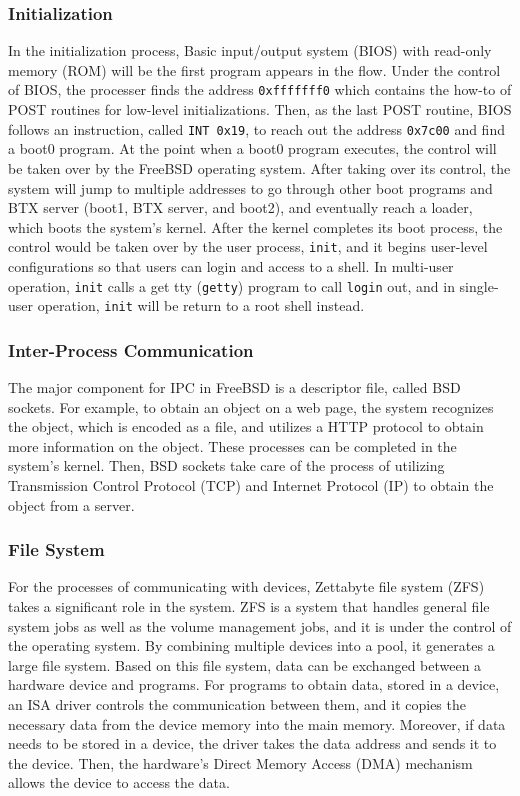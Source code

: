 \documentclass[12pt, dvipsnames, a4paper]{article}
\newcommand{\code}[1]{\texttt{#1}}
\begin{document}
\subsubsection{Initialization}
In the initialization process, Basic input/output system (BIOS) with read-only memory (ROM) will be the first program appears in the flow. Under the control of BIOS, the processer finds the address \code{0xfffffff0} which contains the how-to of POST routines for low-level initializations. Then, as the last POST routine, BIOS follows an instruction, called \code{INT 0x19}, to reach out the address \code{0x7c00} and find a boot0 program. At the point when a boot0 program executes, the control will be taken over by the FreeBSD operating system. After taking over its control, the system will jump to multiple addresses to go through other boot programs and BTX server (boot1, BTX server, and boot2), and eventually reach a loader, which boots the system’s kernel. After the kernel completes its boot process, the control would be taken over by the user process, \code{init}, and it begins user-level configurations so that users can login and access to a shell. In multi-user operation, \code{init} calls a get tty (\code{getty}) program to call \code{login} out, and in single-user operation, \code{init} will be return to a root shell instead.\par
\subsubsection{Inter-Process Communication}
The major component for IPC in FreeBSD is a descriptor file, called BSD sockets. For example, to obtain an object on a web page, the system recognizes the object, which is encoded as a file, and utilizes a HTTP protocol to obtain more information on the object. These processes can be completed in the system’s kernel. Then, BSD sockets take care of the process of utilizing Transmission Control Protocol (TCP) and Internet Protocol (IP) to obtain the object from a server.\par
\subsubsection{File System}
For the processes of communicating with devices, Zettabyte file system (ZFS) takes a significant role in the system. ZFS is a system that handles general file system jobs as well as the volume management jobs, and it is under the control of the operating system. By combining multiple devices into a pool, it generates a large file system. Based on this file system, data can be exchanged between a hardware device and programs. For programs to obtain data, stored in a device, an ISA driver controls the communication between them, and it copies the necessary data from the device memory into the main memory. Moreover, if data needs to be stored in a device, the driver takes the data address and sends it to the device. Then, the hardware’s Direct Memory Access (DMA) mechanism allows the device to access the data.\par
\end{document}
